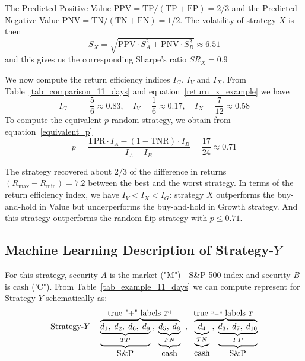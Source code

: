\documentclass{article}
\begin{document}
The Predicted Positive Value $\text{PPV}=\text{TP}/(\text{TP}+\text{FP})=2/3$ 
and the Predicted Negative Value
$\text{PNV}=\text{TN}/(\text{TN} + \text{FN}) = 1/2$. The volatility of strategy-$X$ is then
\begin{equation}
S_{X}=\sqrt{ \text{PPV} \cdot S_{A}^{2} + \text{PNV}\cdot S_{B}^{2}}
\approx 6.51
\end{equation}
and this gives us the corresponding Sharpe's ratio $SR_{X}=0.9$

We now compute the return efficiency indices $I_{G}$, $I_{V}$ and $I_{X}$.
From Table~\ref{tab_comparison_11_days} and equation~\eqref{return_x_example} we have
\begin{equation*}
I_{G} = %
=\frac{5}{6}\approx 0.83, \quad 
I_{V} %
=\frac{1}{6}\approx 0.17, \quad 
I_{X} %
=\frac{7}{12}\approx 0.58
\label{accuracy_index_benchmark_x}
\end{equation*}
To compute the equivalent $p$-random strategy, we obtain from equation~\eqref{equivalent_p}
\begin{equation*}
p=\frac{\text{TPR}\cdot I_{A}-(1-\text{TNR})\cdot I_{B}}{I_{A}-I_{B}}=\frac{17}{24}\approx 0.71
\end{equation*}

\noindent
The strategy recovered about 2/3 of the difference in returns $(R_{\max}-R_{\min})=7.2$ between the best and the worst strategy.
In terms of the return efficiency index, we have $I_{V}<I_{X}<I_{G}$: strategy $X$ outperforms the buy-and-hold in Value but underperforms the buy-and-hold in Growth strategy. And this strategy 
outperforms the random flip strategy with $p\leq 0.71$.

\subsection{Machine Learning Description of Strategy-$Y$} 

For this strategy, security $A$ is the market ("M") - S{\&}P-500 index and security $B$ is cash ('C").
From Table~\ref{tab_example_11_days} we can compute represent for Strategy-$Y$ schematically as:
\begin{equation*}
    \hbox{Strategy-}Y  \quad \overbrace{\underbrace{
    \underbrace{ d_{1},\; d_{2},\; d_{6},\; d_{9}}_{TP}}_{\hbox{S{\&}P}}\; , 
    \;\underbrace{\underbrace{d_{5},\; d_{8}}_{FN}}_{\hbox{cash}}}^{\hbox{true "+" labels }T^{+}}
    \;\; , \;\; 
    \overbrace{
\underbrace{\underbrace{d_{4}}_{TN}}_{\hbox{cash}}\; , \; 
\underbrace{\underbrace{d_{3},\; d_{7},\; d_{10}}_{FP}}_{\hbox{S{\&}P}}}
^{\hbox{true } "-"
\hbox{ labels } T^{-}} 
\end{equation*}
\end{document}
